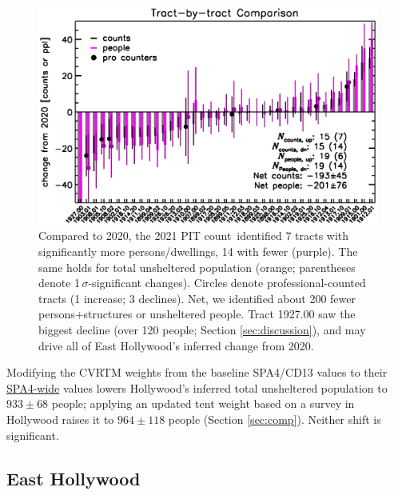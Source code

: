 \documentclass[11pt,twocolumn]{article}
\def\Count{count}
\begin{document}
\begin{figure}[]
	\centering
	\includegraphics[width = 0.9\linewidth, trim = 0cm 0cm 0cm 0cm]{tractsYrYr}
	\caption{Compared to 2020, the 2021 PIT \Count\ identified 7 tracts with significantly more
			persons/dwellings, 14 with fewer (purple). The same holds for total unsheltered 
			population (orange; parentheses denote 1\,$\sigma$-significant changes). 
			Circles denote professional-counted tracts (1 increase; 3 declines). Net, 
			we identified about 200 fewer persons+structures or unsheltered 
			people. Tract 1927.00 saw the biggest decline (over 120 people; Section \ref{sec:discussion}), and
			may drive all of East Hollywood's inferred change from 2020.}
	\label{fig:tractYrYr}
\end{figure}

Modifying the CVRTM weights from the baseline SPA4/CD13 values to their 
\href{https://www.lahsa.org/documents?id=4693-2020-greater-los-angeles-homeless-count-cvrtm-conversion-factors}
{SPA4-wide} values lowers Hollywood's inferred total unsheltered population to $933\pm68$ people; applying
an updated tent weight based on a survey in Hollywood raises it to $964\pm118$ people (Section
\ref{sec:comp}). Neither shift is significant.

\subsection{East Hollywood}
\label{sec:eHo}
\end{document}
